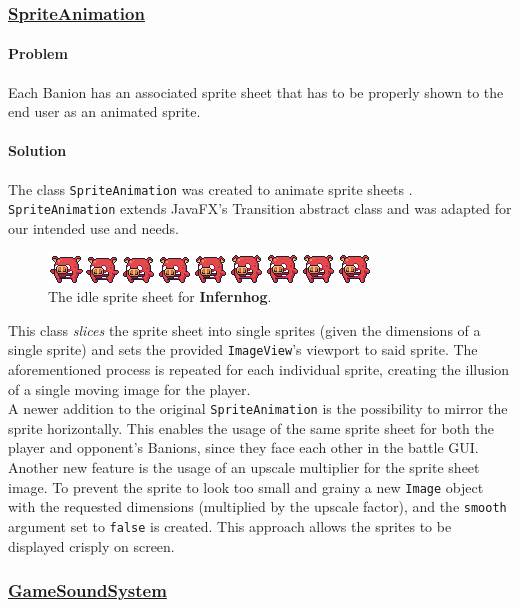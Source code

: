 \documentclass[12pt, a4paper]{report}
\theoremstyle{definition}
\begin{document}
    \subsubsection{\underline{SpriteAnimation}}
    \paragraph{Problem}
    Each Banion has an associated sprite sheet that has to be properly shown to the end user as an animated sprite.
    \paragraph{Solution}
    The class \verb|SpriteAnimation| was created to animate sprite sheets \cite{spriteSheets}. \verb|SpriteAnimation| \cite{spriteAnimation} extends JavaFX's Transition
    abstract class and was adapted for our intended use and needs.

    \begin{figure}[h]
    \centering{}
    \caption{The idle sprite sheet for \textbf{Infernhog}.}
    \includegraphics[width=\textwidth]{spritesheet}
    \end{figure}

    This class \textit{slices} the sprite sheet into single sprites (given the dimensions of a single sprite) and sets the provided \verb|ImageView|'s viewport to said sprite.
    The aforementioned process is repeated for each individual sprite, creating the illusion of a single moving image for the player.\\
    A newer addition to the original \verb|SpriteAnimation| is the possibility to mirror the sprite horizontally. This enables the usage of
    the same sprite sheet for both the player and opponent's Banions, since they face each other in the battle GUI.\\
    Another new feature is the usage of an upscale multiplier for the sprite sheet image. To prevent the sprite to look too small
    and grainy a new \verb|Image| object with the requested dimensions (multiplied by the upscale factor), and the \verb|smooth| argument
    set to \verb|false| is created.
    This approach allows the sprites to be displayed crisply on screen.

    \subsubsection{\underline{GameSoundSystem}}
\end{document}
